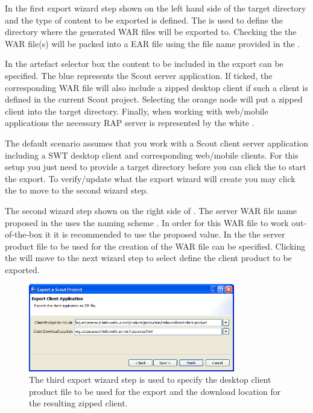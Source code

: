 \documentclass[a4paper,10pt,twoside]{book}
\begin{document}
In the first export wizard step shown on the left hand side of  the target directory and the type of content to be exported is defined. 
The  is used to define the directory where the generated WAR files will be exported to. 
Checking the  the WAR file(s) will be packed into a EAR file using the file name provided in the . 

In the artefact selector box the content to be included in the export can be specified. 
The blue  represents the Scout server application. 
If ticked, the corresponding WAR file will also include a zipped desktop client if such a client is defined in the current Scout project. 
Selecting the orange  node will put a zipped client into the target directory. 
Finally, when working with web/mobile applications the necessary RAP server is represented by the white . 

The default scenario assumes that you work with a Scout client server application including a SWT desktop client and corresponding web/mobile clients. 
For this setup you just need to provide a target directory before you can click the  to start the export. 
To verify/update what the export wizard will create you may click the  to move to the second wizard step.

The second wizard step shown on the right side of . 
The server WAR file name proposed in the  uses the naming scheme . 
In order for this WAR file to work out-of-the-box it it is recommended to use the proposed value. 
In the  the server product file to be used for the creation of the WAR file can be specified. 
Clicking the  will move to the next wizard step to select define the client product to be exported.

\begin{figure}
\includegraphics[width=9cm]{wizard_export_client_application.png}
\caption{The third export wizard step is used to specify the desktop client product file to be used for the export and the download location for the resulting zipped client.}
\end{figure}
\end{document}

